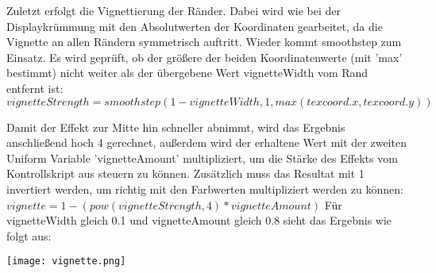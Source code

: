 Zuletzt erfolgt die Vignettierung der Ränder. Dabei wird wie bei der Displaykrümmung mit den Absolutwerten der Koordinaten gearbeitet, da die Vignette an allen Rändern symmetrisch auftritt. Wieder kommt smoothstep zum Einsatz. Es wird geprüft, ob der grö{\ss}ere der beiden Koordinatenwerte (mit 'max' bestimmt) nicht weiter als der übergebene Wert vignetteWidth vom Rand entfernt ist: $vignetteStrength = smoothstep(1 - vignetteWidth, 1, max(texcoord.x, texcoord.y))$

Damit der Effekt zur Mitte hin schneller abnimmt, wird das Ergebnis anschlie{\ss}end hoch 4 gerechnet, au{\ss}erdem wird der erhaltene Wert mit der zweiten Uniform Variable 'vignetteAmount' multipliziert, um die Stärke des Effekts vom Kontrollskript aus steuern zu können. Zusätzlich muss das Resultat mit 1 invertiert werden, um richtig mit den Farbwerten multipliziert werden zu können: $vignette = 1 - (pow(vignetteStrength, 4) * vignetteAmount)$
Für vignetteWidth gleich 0.1 und vignetteAmount gleich 0.8 sieht das Ergebnis wie folgt aus:

\texttt{[image: vignette.png]}

